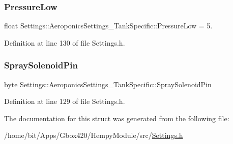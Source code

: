 \subsubsection{\texorpdfstring{Pressure\+Low}{PressureLow}}
{\footnotesize\ttfamily float Settings\+::\+Aeroponics\+Settings\+\_\+\+Tank\+Specific\+::\+Pressure\+Low = 5.}



Definition at line 130 of file Settings.\+h.

\mbox{\label{struct_settings_1_1_aeroponics_settings___tank_specific_a622a767a391bbed1dab66c80d18259b7}} 
\subsubsection{\texorpdfstring{Spray\+Solenoid\+Pin}{SpraySolenoidPin}}
{\footnotesize\ttfamily byte Settings\+::\+Aeroponics\+Settings\+\_\+\+Tank\+Specific\+::\+Spray\+Solenoid\+Pin}



Definition at line 129 of file Settings.\+h.



The documentation for this struct was generated from the following file\+:\begin{DoxyCompactItemize}
\item 
/home/bit/\+Apps/\+Gbox420/\+Hempy\+Module/src/\hyperlink{_hempy_module_2src_2_settings_8h}{Settings.\+h}\end{DoxyCompactItemize}
